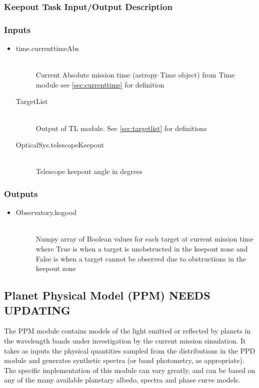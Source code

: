\documentclass[cleanfoot]{asme2ej}
\begin{document}
\subsubsection{Keepout Task Input/Output Description} \label{sec:keepouttask}

\subsubsection*{Inputs}
\begin{itemize}
    \item
    \begin{description}
        \item[time.currenttimeAbs] \hfill \\
        Current Absolute mission time (astropy Time object) from Time module see \ref{sec:currenttime} for definition
        \item[TargetList] \hfill \\
        Output of TL module. See \ref{sec:targetlist} for definitions
        \item[OpticalSys.telescopeKeepout] \hfill \\
        Telescope keepout angle in degrees
    \end{description}
\end{itemize}

\subsubsection*{Outputs}
\begin{itemize}
    \item 
    \begin{description}
        \item[Observatory.kogood] \hfill \\
        Numpy array of Boolean values for each target at current mission time where True is when a target is unobstructed in the keepout zone and False is when a target cannot be observed due to obstructions in the keepout zone
    \end{description}
\end{itemize}




\subsection{Planet Physical Model (PPM) NEEDS UPDATING}
The PPM module contains models of the light emitted or reflected by planets in the wavelength bands under investigation by the current mission simulation.  It takes as inputs the physical quantities sampled from the distributions in the PPD module and generates synthetic spectra (or band photometry, as appropriate).  The specific implementation of this module can vary greatly, and can be based on any of the many available planetary albedo, spectra and phase curve models.
\label{sec:planetphysicalmodel}
\end{document}
